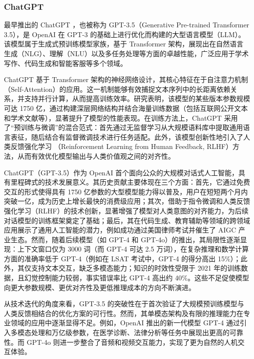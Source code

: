 \subsubsection{ChatGPT}
\label{sec:TOSWT-gen-chatgpt}

最早推出的 ChatGPT \cite{chatgpt}，也被称为 GPT-3.5（Generative Pre-trained Transformer 3.5），是 OpenAI 在 GPT-3 的基础上进行优化而构建的大型语言模型（LLM）。该模型属于生成式预训练模型家族，基于 Transformer 架构，展现出在自然语言生成（NLG）、理解（NLU）以及多任务处理等方面的卓越性能，广泛应用于学术写作、代码生成和智能客服等多个领域。

ChatGPT 基于 Transformer 架构的神经网络设计，其核心特征在于自注意力机制（Self-Attention）的应用。这一机制能够有效捕捉文本序列中的长距离依赖关系，并支持并行计算，从而提高训练效率。研究表明，该模型的某些版本参数规模可达 1750 亿，通过构建深层网络结构并结合海量训练数据（包括互联网公开文本和学术文献等），显著提升了模型的性能表现。在训练方法上，ChatGPT 采用了“预训练与微调”的混合范式：首先通过无监督学习从大规模语料库中提取通用语言表征，随后结合有监督微调技术进行任务适配。此外，该模型创新性地引入了人类反馈强化学习 \cite{kaufmann2024surveyreinforcementlearninghuman}（Reinforcement Learning from Human Feedback, RLHF）方法，从而有效优化模型输出与人类价值观之间的对齐性。

ChatGPT（GPT-3.5）作为 OpenAI 首个面向公众的大规模对话式人工智能，具有里程碑式的技术发展意义。其历史贡献主要体现在三个方面：首先，它通过免费交互的形式使得具有 1750 亿参数的大型模型能力得以普及，用户在短短两个月内突破一亿，成为历史上增长最快的消费级应用；其次，借助于指令微调和人类反馈强化学习（RLHF）的技术创新，显著增强了模型对人类意图的对齐能力，为后续对话模型的训练框架奠定了基础；最后，其在代码生成、教育辅助等领域的跨领域应用展示了通用人工智能的潜力，例如成功通过美国律师考试并催生了 AIGC 产业生态。然而，随着后续模型（如 GPT-4 和 GPT-4o）的推出，其局限性逐渐显现：上下文窗口仅为 3000 词（而 GPT-4 可达 2.5 万词），在复杂推理和数学计算方面的准确率低于 GPT-4（例如在 LSAT 考试中，GPT-4 的得分高出 15\%）；此外，其仅支持文本交互，缺乏多模态能力；知识的时效性受限于 2021 年的训练数据，且幻觉控制能力较弱，事实错误率比 GPT-4 高出约 40\%。这些不足促使模型向更大参数规模、更优对齐性及更低推理成本的方向不断演进。

从技术迭代的角度来看，GPT-3.5 的突破性在于首次验证了大规模预训练模型与人类反馈相结合的优化方案的可行性。然而，其单模态架构及有限的推理能力在专业领域的应用中逐渐显得不足。例如，OpenAI 推出的新一代模型 GPT-4 通过引入多模态处理和万亿级参数，在医学诊断、法律分析等任务中展现出更高的可靠性。而 GPT-4o 则进一步整合了音频和视频交互能力，实现了更为自然的人机交互体验。


